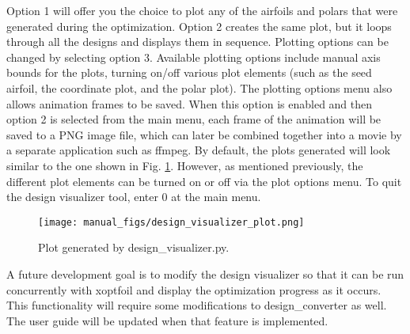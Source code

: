 \documentclass[11pt]{article}
\begin{document}
Option 1 will offer you the choice to plot any of the airfoils and polars that were
generated during the optimization.  Option 2 creates the same plot, but it loops through
all the designs and displays them in sequence.  Plotting options can be changed by
selecting option 3.  Available plotting options include manual axis bounds for the plots,
turning on/off various plot elements (such as the seed airfoil, the coordinate plot, and
the polar plot).  The plotting options menu also allows animation frames to be saved.
When this option is enabled and then option 2 is selected from the main menu, each frame
of the animation will be saved to a PNG image file, which can later be combined together
into a movie by a separate application such as ffmpeg.  By default, the plots generated 
will look similar to the one shown in Fig. \ref{fig:design_visualizer_plot}.  However, as
mentioned previously, the different plot elements can be turned on or off via the plot 
options menu. To quit the design visualizer tool, enter 0 at the main menu.

\begin{figure}
\centering
  \texttt{[image: manual\_figs/design\_visualizer\_plot.png]}
\caption{Plot generated by design\_visualizer.py.}
\label{fig:design_visualizer_plot}
\end{figure}

A future development goal is to modify the design visualizer so that it can be run
concurrently with xoptfoil and display the optimization progress as it occurs.  This
functionality will require some modifications to design\_converter as well.  The user
guide will be updated when that feature is implemented.
\end{document}

